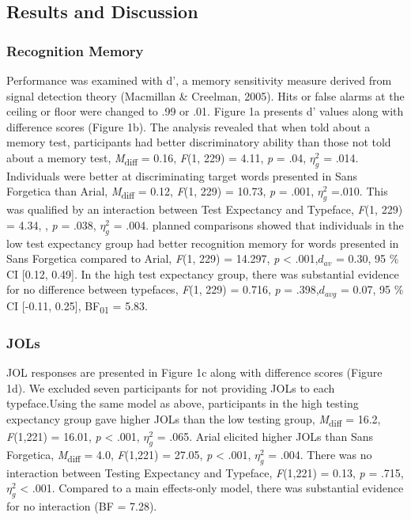 \documentclass[
  english,
  jou]{apa7}
\begin{document}
\hypertarget{results-and-discussion}{%
\subsection{Results and Discussion}\label{results-and-discussion}}

\hypertarget{recognition-memory}{%
\subsubsection{Recognition Memory}\label{recognition-memory}}

Performance was examined with d', a memory sensitivity measure derived from signal detection theory (Macmillan \& Creelman, 2005). Hits or false alarms at the ceiling or floor were changed to .99 or .01. Figure 1a presents d' values along with difference scores (Figure 1b). The analysis revealed that when told about a memory test, participants had better discriminatory ability than those not told about a memory test, \emph{M}\textsubscript{diff} = 0.16, \emph{F}(1, 229) = 4.11, \emph{p} = .04, \(\eta_{g}^{2}\) = .014. Individuals were better at discriminating target words presented in Sans Forgetica than Arial, \emph{M}\textsubscript{diff} = 0.12, \emph{F}(1, 229) = 10.73, \emph{p} = .001, \(\eta_{g}^{2}\) =.010. This was qualified by an interaction between Test Expectancy and Typeface, \emph{F}(1, 229) = 4.34, , \emph{p} = .038, \(\eta_{g}^{2}\) = .004. planned comparisons showed that individuals in the low test expectancy group had better recognition memory for words presented in Sans Forgetica compared to Arial, \emph{F}(1, 229) = 14.297, \emph{p} \textless{} .001,\(d_{av}\) = 0.30, 95 \% CI {[}0.12, 0.49{]}. In the high test expectancy group, there was substantial evidence for no difference between typefaces, \emph{F}(1, 229) = 0.716, \emph{p} = .398,\(d_{avg}\) = 0.07, 95 \% CI {[}-0.11, 0.25{]}, BF\textsubscript{01} = 5.83.

\hypertarget{jols}{%
\subsubsection{JOLs}\label{jols}}

JOL responses are presented in Figure 1c along with difference scores (Figure 1d). We excluded seven participants for not providing JOLs to each typeface.Using the same model as above, participants in the high testing expectancy group gave higher JOLs than the low testing group, \emph{M}\textsubscript{diff} = 16.2, \emph{F}(1,221) = 16.01, \emph{p} \textless{} .001, \(\eta_{g}^{2}\) = .065. Arial elicited higher JOLs than Sans Forgetica, \emph{M}\textsubscript{diff} = 4.0, \emph{F}(1,221) = 27.05, \emph{p} \textless{} .001, \(\eta_{g}^{2}\) = .004. There was no interaction between Testing Expectancy and Typeface, \emph{F}(1,221) = 0.13, \emph{p} = .715, \(\eta_{g}^{2}\) \textless{} .001. Compared to a main effects-only model, there was substantial evidence for no interaction (BF = 7.28).
\end{document}

